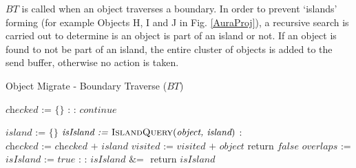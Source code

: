$BT$ is called when an object traverses a boundary. In order to prevent `islands' forming (for example Objects H, I and J in Fig. \ref{AuraProj}), a recursive search is carried out to determine is an object is part of an island or not. If an object is found to not be part of an island, the entire cluster of objects is added to the send buffer, otherwise no action is taken.

\begin{algorithm}
	\caption{Object Migrate - Boundary Traverse ($BT$)}\label{boundaryAlgorithm}
	\begin{algorithmic}[1]	
		\State $\textit{checked := \{\}}$	
		\State
		 : 
		:
		\State $\textit{continue}$
		\EndIf
		
		\State $\textit{island := \{\}}$
		\State $\textit{isIsland := }\Call{IslandQuery}{\textit{object, island}}$
		:
		\State {}
		\EndIf
		\State $\textit{checked := checked + island}$
		\EndFor
		\EndProcedure
		\State
		\State $\textit{visited := visited + object}$
		\State return $\textit{false}$
		\EndIf
		\State
		\State $\textit{overlaps :=}$ 
		\State
		\State $\textit{isIsland := true}$
		 :
		:
		\State $\textit{isIsland \&= }$ 
		\EndIf
		\EndFor
		\State return $\textit{isIsland}$
		\EndFunction
	\end{algorithmic}
\end{algorithm}

